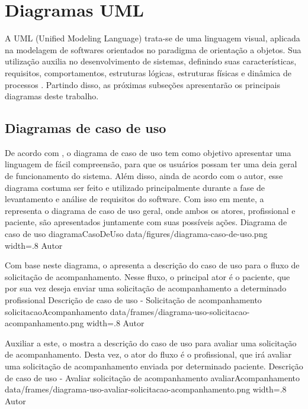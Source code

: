 \section{Diagramas UML}
\label{sec:diagramas}

A UML (Unified Modeling Language) trata-se de uma linguagem visual, aplicada na modelagem de softwares orientados no paradigma de orientação a objetos. Sua utilização auxilia no desenvolvimento de sistemas, definindo suas características, requisitos, comportamentos, estruturas lógicas, estruturas físicas e dinâmica de processos \cite{Guedes2018}. Partindo disso, as próximas subseções apresentarão os principais diagramas deste trabalho.

\subsection{Diagramas de caso de uso}
\label{sec:diagramasDeCasoDeUso}
De acordo com , o diagrama de caso de uso tem como objetivo apresentar uma linguagem de fácil compreensão, para que os usuários possam ter uma deia geral de funcionamento do sistema. Além disso, ainda de acordo com o autor, esse diagrama costuma ser feito e utilizado principalmente durante a fase de levantamento e análise de requisitos do software. Com isso em mente, a  representa o diagrama de caso de uso geral, onde ambos os atores, profissional e paciente, são apresentados juntamente com suas possíveis ações.
\image
    {Diagrama de caso de uso}
    {diagramaCasoDeUso}
    {data/figures/diagrama-caso-de-uso.png}
    {width=.8\textwidth}
    {Autor}

Com base neste diagrama, o  apresenta a descrição do caso de uso para o fluxo de solicitação de acompanhamento. Nesse fluxo, o principal ator é o paciente, que por sua vez deseja enviar uma solicitação de acompanhamento a determinado profissional
\customFrame
    {Descrição de caso de uso - Solicitação de acompanhamento}
    {solicitacaoAcompanhamento}
    {data/frames/diagrama-uso-solicitacao-acompanhamento.png}
    {width=.8\textwidth}
    {Autor}

Auxiliar a este, o  mostra a descrição do caso de uso para avaliar uma solicitação de acompanhamento. Desta vez, o ator do fluxo é o profissional, que irá avaliar uma solicitação de acompanhamento enviada por determinado paciente.
\customFrame
    {Descrição de caso de uso - Avaliar solicitação de acompanhamento}
    {avaliarAcompanhamento}
    {data/frames/diagrama-uso-avaliar-solicitacao-acompanhamento.png}
    {width=.8\textwidth}
    {Autor}

